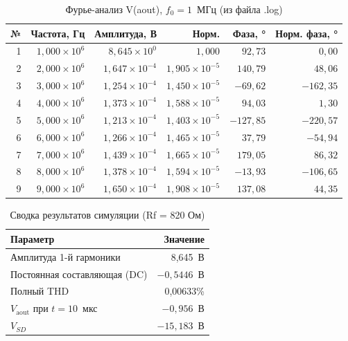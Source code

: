 \documentclass[a4paper, 12pt]{article}
\begin{document}
\begin{table}[H]
\centering
\caption{Фурье-анализ V(aout), \(f_0 = 1\)~МГц (из файла .log)}
\label{tab:fourier}
\begin{tabular}{@{}rrrrrr@{}}
\toprule
\textbf{№} &
\textbf{Частота, Гц} &
\textbf{Амплитуда, В} &
\textbf{Норм.} &
\textbf{Фаза, °} &
\textbf{Норм. фаза, °} \\
\midrule
1 & \(1{,}000\times10^6\) & \(8{,}645\times10^0\) & \(1{,}000\) & \(92{,}73\) & \(0{,}00\) \\
2 & \(2{,}000\times10^6\) & \(1{,}647\times10^{-4}\) & \(1{,}905\times10^{-5}\) & \(140{,}79\) & \(48{,}06\) \\
3 & \(3{,}000\times10^6\) & \(1{,}254\times10^{-4}\) & \(1{,}450\times10^{-5}\) & \(-69{,}62\) & \(-162{,}35\) \\
4 & \(4{,}000\times10^6\) & \(1{,}373\times10^{-4}\) & \(1{,}588\times10^{-5}\) & \(94{,}03\) & \(1{,}30\) \\
5 & \(5{,}000\times10^6\) & \(1{,}213\times10^{-4}\) & \(1{,}403\times10^{-5}\) & \(-127{,}85\) & \(-220{,}57\) \\
6 & \(6{,}000\times10^6\) & \(1{,}266\times10^{-4}\) & \(1{,}465\times10^{-5}\) & \(37{,}79\) & \(-54{,}94\) \\
7 & \(7{,}000\times10^6\) & \(1{,}439\times10^{-4}\) & \(1{,}665\times10^{-5}\) & \(179{,}05\) & \(86{,}32\) \\
8 & \(8{,}000\times10^6\) & \(1{,}378\times10^{-4}\) & \(1{,}594\times10^{-5}\) & \(-13{,}93\) & \(-106{,}65\) \\
9 & \(9{,}000\times10^6\) & \(1{,}650\times10^{-4}\) & \(1{,}908\times10^{-5}\) & \(137{,}08\) & \(44{,}35\) \\
\bottomrule
\end{tabular}
\end{table}

\begin{table}[H]
\centering
\caption{Сводка результатов симуляции (Rf = 820 Ом)}
\label{tab:summary}
\begin{tabular}{@{}lr@{}}
\toprule
\textbf{Параметр} & \textbf{Значение} \\
\midrule
Амплитуда 1-й гармоники       & 8{,}645~В \\
Постоянная составляющая (DC)  & \(-0{,}5446\)~В \\
Полный THD                    & 0{,}00633\% \\
\(V_{\text{aout}}\) при \(t=10\)~мкс & \(-0{,}956\)~В \\
\(V_{SD}\)                      & \(-15{,}183\)~В \\
\bottomrule
\end{tabular}
\end{table}
\end{document}

